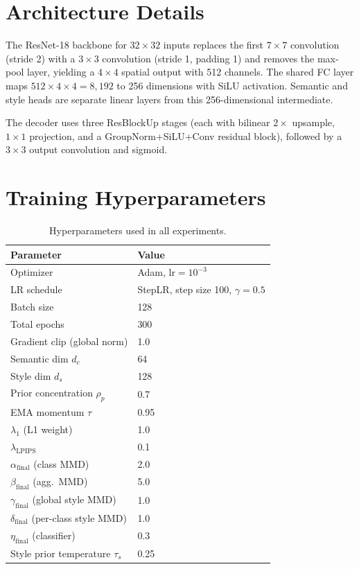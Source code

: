 \documentclass[10pt]{article}
\begin{document}
\appendix

\section{Architecture Details}
\label{app:arch}

The ResNet-18 backbone for $32\times32$ inputs replaces the first $7\times7$
convolution (stride 2) with a $3\times3$ convolution (stride 1, padding 1) and
removes the max-pool layer, yielding a $4\times4$ spatial output with 512 channels.
The shared FC layer maps $512\times4\times4=8{,}192$ to 256 dimensions with SiLU
activation.
Semantic and style heads are separate linear layers from this 256-dimensional
intermediate.

The decoder uses three ResBlockUp stages (each with bilinear $2\times$ upsample,
$1\times1$ projection, and a GroupNorm+SiLU+Conv residual block), followed by a
$3\times3$ output convolution and sigmoid.

\section{Training Hyperparameters}
\label{app:training}

\begin{table}[h]
\centering
\caption{Hyperparameters used in all experiments.}
\label{tab:hyperparams}
\begin{tabular}{ll}
\toprule
Parameter & Value \\
\midrule
Optimizer & Adam, $\mathrm{lr}=10^{-3}$ \\
LR schedule & StepLR, step size 100, $\gamma=0.5$ \\
Batch size & 128 \\
Total epochs & 300 \\
Gradient clip (global norm) & 1.0 \\
Semantic dim $d_c$ & 64 \\
Style dim $d_s$ & 128 \\
Prior concentration $\rho_p$ & 0.7 \\
EMA momentum $\tau$ & 0.95 \\
$\lambda_1$ (L1 weight) & 1.0 \\
$\lambda_{\mathrm{LPIPS}}$ & 0.1 \\
$\alpha_{\mathrm{final}}$ (class MMD) & 2.0 \\
$\beta_{\mathrm{final}}$ (agg.\ MMD) & 5.0 \\
$\gamma_{\mathrm{final}}$ (global style MMD) & 1.0 \\
$\delta_{\mathrm{final}}$ (per-class style MMD) & 1.0 \\
$\eta_{\mathrm{final}}$ (classifier) & 0.3 \\
Style prior temperature $\tau_s$ & 0.25 \\
\bottomrule
\end{tabular}
\end{table}
\end{document}
